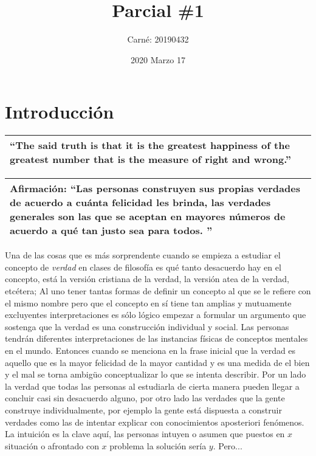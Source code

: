 \documentclass{article}
\title{Parcial \#1}
\date{2020 Marzo 17}
\author{Carné: 20190432}
\begin{document}
\maketitle
\section{Introducción}
\begin{center}
    \begin{tabular}{ |p{14cm}| }
        \hline
            ``The said truth is that it is the greatest happiness of the greatest number that is the measure of right and wrong.'' \\
        \hline
    \end{tabular}
\end{center}
\begin{center}
    \begin{tabular}{ |p{14cm}| }
        \hline
        Afirmación: ``Las personas construyen sus propias verdades de acuerdo a cuánta felicidad les brinda, las verdades generales son las que se aceptan en mayores números de acuerdo a qué tan justo sea para todos. '' \\ 
        \hline
    \end{tabular}
\end{center}
Una de las cosas que es más sorprendente cuando se empieza a estudiar el concepto de \emph{verdad} en clases de filosofía es qué tanto desacuerdo hay en el concepto, está la versión cristiana de la verdad, la versión atea de la verdad, etcétera; Al uno tener tantas formas de definir un concepto al que se le refiere con el mismo nombre pero que el concepto en sí tiene tan amplias y mutuamente excluyentes interpretaciones es sólo lógico empezar a formular un argumento que sostenga que la verdad es una construcción individual y social. Las personas tendrán diferentes interpretaciones de las instancias físicas de conceptos mentales en el mundo. Entonces cuando se menciona en la frase inicial que la verdad es aquello que es la mayor felicidad de la mayor cantidad y es una medida de el bien y el mal se torna ambigüo conceptualizar lo que se intenta describir. Por un lado la verdad que todas las personas al estudiarla de cierta manera pueden llegar a concluir casi sin desacuerdo alguno, por otro lado las verdades que la gente construye individualmente, por ejemplo la gente está dispuesta a construir verdades como las de intentar explicar con conocimientos aposteriori fenómenos. La intuición es la clave aquí, las personas intuyen o asumen que puestos en $x$ situación o afrontado con $x$ problema la solución sería $y$. Pero...    
\end{document}
